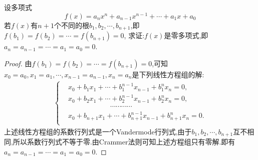 \documentclass[../../main.tex]{subfiles}
\begin{document}
\begin{proposition}\label{proposition:多项式根的有限性}
设多项式
\[
f(x)=a_nx^n + a_{n - 1}x^{n - 1}+\cdots+a_1x + a_0
\]
若\(f(x)\)有\(n + 1\)个不同的根\(b_1,b_2,\cdots,b_{n+1}\),即\(f(b_1)=f(b_2)=\cdots=f(b_{n+1})=0\),
求证:\(f(x)\)是零多项式,即\(a_n=a_{n - 1}=\cdots=a_1=a_0 = 0\).
\end{proposition}
\begin{proof}
由\(f(b_1)=f(b_2)=\cdots=f(b_{n+1})=0\),可知$x_0=a_0,x_1=a_1,\cdots ,x_{n-1}=a_{n-1},x_n=a_n$是下列线性方程组的解:
\begin{align*}
\left\{ \begin{aligned}
&x_0+b_1x_1+\cdots +b_{1}^{n-1}x_{n-1}+b_{1}^{n}x_n=0,\\
&x_0+b_2x_1+\cdots +b_{2}^{n-1}x_{n-1}+b_{2}^{n}x_n=0,\\
&\qquad \qquad \qquad \cdots \cdots \cdots \cdots\\
&x_0+b_{n+1}x_1+\cdots +b_{n+1}^{n-1}x_{n-1}+b_{n+1}^{n}x_n=0.\\
\end{aligned} \right. 
\end{align*}
上述线性方程组的系数行列式是一个Vandermode行列式,由于$b_1,b_2,\cdots,b_{n+1}$互不相同,所以系数行列式不等于零.由Crammer法则可知上述方程组只有零解.即有$a_n=a_{n - 1}=\cdots=a_1=a_0 = 0$.
\end{proof}
\end{document}
